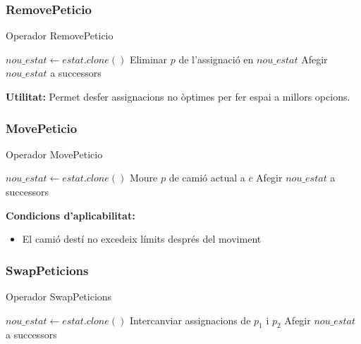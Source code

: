 \subsubsection{RemovePeticio}

\begin{algorithm}[H]
\caption{Operador RemovePeticio}
\begin{algorithmic}[1]
    \State $nou\_estat \gets estat.clone()$
    \State Eliminar $p$ de l'assignació en $nou\_estat$
    \State Afegir $nou\_estat$ a successors
\EndFor
\end{algorithmic}
\end{algorithm}

\textbf{Utilitat:}
Permet desfer assignacions no òptimes per fer espai a millors opcions.

\subsubsection{MovePeticio}

\begin{algorithm}[H]
\caption{Operador MovePeticio}
\begin{algorithmic}[1]
            \State $nou\_estat \gets estat.clone()$
            \State Moure $p$ de camió actual a $c$
                \State Afegir $nou\_estat$ a successors
            \EndIf
        \EndIf
    \EndFor
\EndFor
\end{algorithmic}
\end{algorithm}

\textbf{Condicions d'aplicabilitat:}
\begin{itemize}
    \item El camió destí no excedeix límits després del moviment
\end{itemize}

\subsubsection{SwapPeticions}

\begin{algorithm}[H]
\caption{Operador SwapPeticions}
\begin{algorithmic}[1]
    \State $nou\_estat \gets estat.clone()$
    \State Intercanviar assignacions de $p_1$ i $p_2$
        \State Afegir $nou\_estat$ a successors
    \EndIf
\EndFor
\end{algorithmic}
\end{algorithm}

